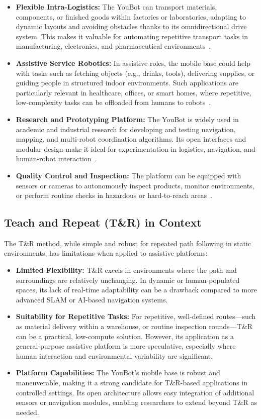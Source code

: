 \documentclass[a4paper, 12pt]{article}
\begin{document}
    \begin{itemize}
        \item \textbf{Flexible Intra-Logistics:} The YouBot can transport materials, components, or finished goods within factories or laboratories, adapting to dynamic layouts and avoiding obstacles thanks to its omnidirectional drive system. This makes it valuable for automating repetitive transport tasks in manufacturing, electronics, and pharmaceutical environments~.
        \item \textbf{Assistive Service Robotics:} In assistive roles, the mobile base could help with tasks such as fetching objects (e.g., drinks, tools), delivering supplies, or guiding people in structured indoor environments. Such applications are particularly relevant in healthcare, offices, or smart homes, where repetitive, low-complexity tasks can be offloaded from humans to robots~.
        \item \textbf{Research and Prototyping Platform:} The YouBot is widely used in academic and industrial research for developing and testing navigation, mapping, and multi-robot coordination algorithms. Its open interfaces and modular design make it ideal for experimentation in logistics, navigation, and human-robot interaction~.
        \item \textbf{Quality Control and Inspection:} The platform can be equipped with sensors or cameras to autonomously inspect products, monitor environments, or perform routine checks in hazardous or hard-to-reach areas~.
    \end{itemize}

    \subsection{Teach and Repeat (T\&R) in Context}

    The T\&R method, while simple and robust for repeated path following in static environments, has limitations when applied to assistive platforms:

    \begin{itemize}
        \item \textbf{Limited Flexibility:} T\&R excels in environments where the path and surroundings are relatively unchanging. In dynamic or human-populated spaces, its lack of real-time adaptability can be a drawback compared to more advanced SLAM or AI-based navigation systems.
        \item \textbf{Suitability for Repetitive Tasks:} For repetitive, well-defined routes---such as material delivery within a warehouse, or routine inspection rounds---T\&R can be a practical, low-compute solution. However, its application as a general-purpose assistive platform is more speculative, especially where human interaction and environmental variability are significant.
        \item \textbf{Platform Capabilities:} The YouBot's mobile base is robust and maneuverable, making it a strong candidate for T\&R-based applications in controlled settings. Its open architecture allows easy integration of additional sensors or navigation modules, enabling researchers to extend beyond T\&R as needed.
    \end{itemize}
\end{document}
